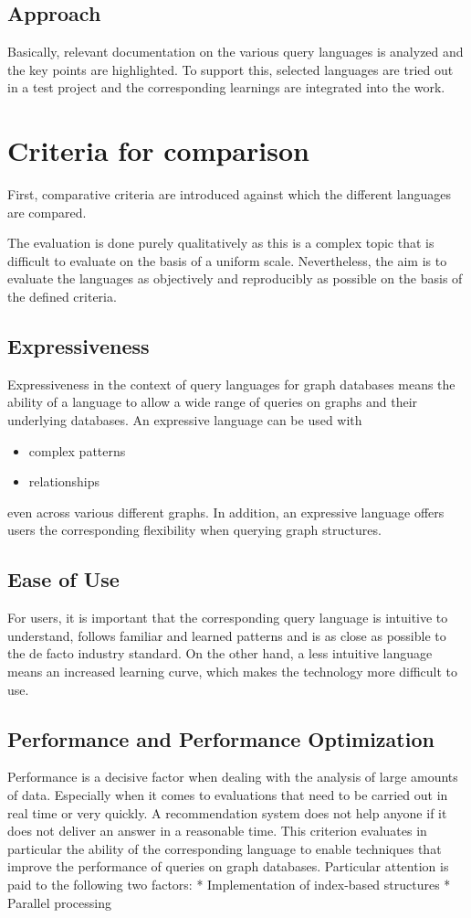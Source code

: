 \section{Approach}
\label{sec:intro:Approach}
Basically, relevant documentation on the various query languages is analyzed and the key points are highlighted. 
To support this, selected languages are tried out in a test project and the corresponding learnings are integrated into the work.


\chapter{Criteria for comparison}
First, comparative criteria are introduced against which the different languages are compared.

The evaluation is done purely qualitatively as this is a complex topic that is difficult to evaluate on the basis of a uniform scale. 
Nevertheless, the aim is to evaluate the languages as objectively and reproducibly as possible on the basis of the defined criteria.

\section{Expressiveness}
Expressiveness in the context of query languages for graph databases means the ability 
of a language to allow a wide range of queries on graphs and their underlying databases.
An expressive language can be used with
\begin{itemize}
	\item complex patterns
	\item relationships
\end{itemize}
even across various different graphs.
In addition, an expressive language offers users the corresponding flexibility
when querying graph structures.

\section{Ease of Use}
For users, it is important that the corresponding query language is intuitive to understand, follows familiar and learned patterns 
and is as close as possible to the de facto industry standard. 
On the other hand, a less intuitive language means an increased learning curve, 
which makes the technology more difficult to use.

\section{Performance and Performance Optimization}
Performance is a decisive factor when dealing with the analysis of large amounts of data. 
Especially when it comes to evaluations that need to be carried out in real time or very quickly. 
A recommendation system does not help anyone if it does not deliver an answer in a reasonable time.
This criterion evaluates in particular the ability of the corresponding language to enable techniques 
that improve the performance of queries on graph databases.
Particular attention is paid to the following two factors:
* Implementation of index-based structures
* Parallel processing

